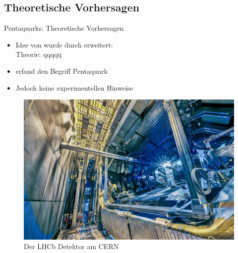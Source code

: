 \documentclass[aspectratio=169]{beamer} %
\begin{document}
    \subsection{Theoretische Vorhersagen}
    \begin{frame}{Pentaquarks: Theoretische Vorhersagen}
      \begin{minipage}{0.54\textwidth}
      \begin{itemize}
        \item Idee von \textcite{GellMann.1964} wurde durch \textcite{Hogaasen.1978, Strottman.1979} erweitert:
        \\
         \hspace{3mm} Theorie: $\mathrm{qqqq\bar{q}}$
         
         \item \textcite{Lipkin.1987} erfand den Begriff Pentaquark
         \\[1em]
         \item Jedoch keine experimentellen Hinweise
      \end{itemize}
    \end{minipage}
\hfill
      \begin{minipage}{0.45\textwidth}
        \begin{figure}
          \centering
          \includegraphics[width=\linewidth, height=\textheight, keepaspectratio]{fsp-LHCb-geoeffneter-detektor-blick-seite-2018-copyright-Brice-Ordan-CERN.jpg}
          \caption{Der LHCb Detektor am CERN\\\scriptsize\cite[Foto © Maximilien Brice, Julien Ordan | CERN ][]{.BMBF}}
        \end{figure}
      \end{minipage}
        \hfill
    \end{frame}
\end{document}
